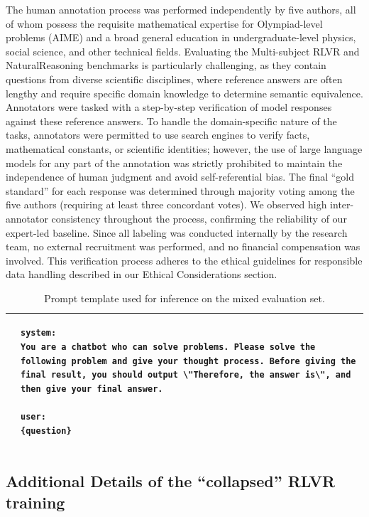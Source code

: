 The human annotation process was performed independently by five authors, all of whom possess the requisite mathematical expertise for Olympiad-level problems (AIME) and a broad general education in undergraduate-level physics, social science, and other technical fields. Evaluating the Multi-subject RLVR and NaturalReasoning benchmarks is particularly challenging, as they contain questions from diverse scientific disciplines, where reference answers are often lengthy and require specific domain knowledge to determine semantic equivalence. Annotators were tasked with a step-by-step verification of model responses against these reference answers. To handle the domain-specific nature of the tasks, annotators were permitted to use search engines to verify facts, mathematical constants, or scientific identities; however, the use of large language models for any part of the annotation was strictly prohibited to maintain the independence of human judgment and avoid self-referential bias. The final ``gold standard'' for each response was determined through majority voting among the five authors (requiring at least three concordant votes). We observed high inter-annotator consistency throughout the process, confirming the reliability of our expert-led baseline. Since all labeling was conducted internally by the research team, no external recruitment was performed, and no financial compensation was involved. This verification process adheres to the ethical guidelines for responsible data handling described in our Ethical Considerations section.

\begin{table}
\centering
\footnotesize
\begin{tabular}{lp{12cm}}
\toprule

&
\begin{lstlisting}[basicstyle=\ttfamily\scriptsize, breaklines=true, aboveskip=0pt, belowskip=0pt]
system: 
You are a chatbot who can solve problems. Please solve the following problem and give your thought process. Before giving the final result, you should output \"Therefore, the answer is\", and then give your final answer.

user:
{question}
\end{lstlisting}
\\
\bottomrule
\end{tabular}
\caption{Prompt template used for inference on the mixed evaluation set.}
\label{tab:appendix:QA}
\end{table}

\subsection{Additional Details of the ``collapsed'' RLVR training} 
\label{app:collpased_run}

